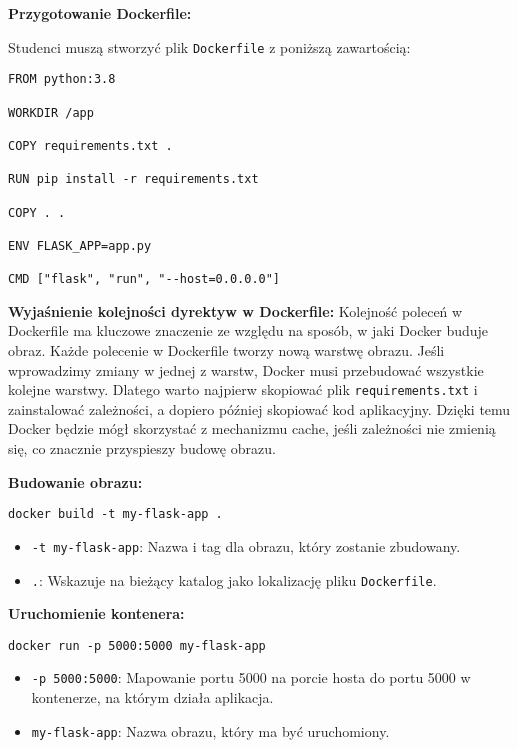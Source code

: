 \documentclass{article}
\begin{document}
\textbf{Przygotowanie Dockerfile:}

Studenci muszą stworzyć plik \texttt{Dockerfile} z poniższą zawartością:

\noindent\begin{lstlisting}
FROM python:3.8

WORKDIR /app

COPY requirements.txt .

RUN pip install -r requirements.txt

COPY . .

ENV FLASK_APP=app.py

CMD ["flask", "run", "--host=0.0.0.0"]
\end{lstlisting}

\textbf{Wyjaśnienie kolejności dyrektyw w Dockerfile:}  
Kolejność poleceń w Dockerfile ma kluczowe znaczenie ze względu na sposób, w jaki Docker buduje obraz. Każde polecenie w Dockerfile tworzy nową warstwę obrazu. Jeśli wprowadzimy zmiany w jednej z warstw, Docker musi przebudować wszystkie kolejne warstwy. Dlatego warto najpierw skopiować plik \texttt{requirements.txt} i zainstalować zależności, a dopiero później skopiować kod aplikacyjny. Dzięki temu Docker będzie mógł skorzystać z mechanizmu cache, jeśli zależności nie zmienią się, co znacznie przyspieszy budowę obrazu.

\textbf{Budowanie obrazu:}

\noindent\begin{lstlisting}
docker build -t my-flask-app .
\end{lstlisting}

\begin{itemize}
    \item \texttt{-t my-flask-app}: Nazwa i tag dla obrazu, który zostanie zbudowany.
    \item \texttt{.}: Wskazuje na bieżący katalog jako lokalizację pliku \texttt{Dockerfile}.
\end{itemize}

\textbf{Uruchomienie kontenera:}

\noindent\begin{lstlisting}
docker run -p 5000:5000 my-flask-app
\end{lstlisting}

\begin{itemize}
    \item \texttt{-p 5000:5000}: Mapowanie portu 5000 na porcie hosta do portu 5000 w kontenerze, na którym działa aplikacja.
    \item \texttt{my-flask-app}: Nazwa obrazu, który ma być uruchomiony.
\end{itemize}
\end{document}
